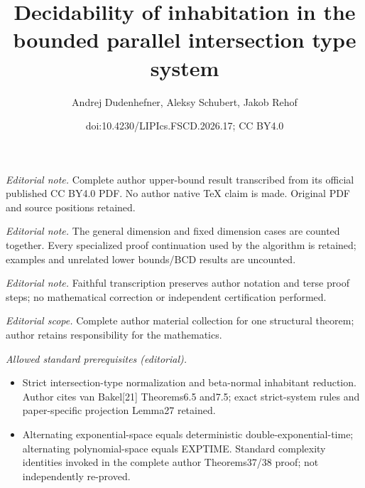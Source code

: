 \documentclass[10pt,a4paper]{article}
\title{Decidability of inhabitation in the bounded parallel intersection type system}
\author{Andrej Dudenhefner, Aleksy Schubert, Jakob Rehof}
\date{doi:10.4230/LIPIcs.FSCD.2026.17; CC BY4.0}
\begin{document}
\maketitle
\noindent\textit{Editorial note.} Complete author upper-bound result transcribed from its official published CC BY4.0 PDF. No author native TeX claim is made. Original PDF and source positions retained.\par\medskip
\noindent\textit{Editorial note.} The general dimension and fixed dimension cases are counted together. Every specialized proof continuation used by the algorithm is retained; examples and unrelated lower bounds/BCD results are uncounted.\par\medskip
\noindent\textit{Editorial note.} Faithful transcription preserves author notation and terse proof steps; no mathematical correction or independent certification performed.\par\medskip
\noindent\textit{Editorial scope.} Complete author material collection for one structural theorem; author retains responsibility for the mathematics.\par\medskip
\noindent\textit{Allowed standard prerequisites (editorial).}\begin{itemize}
\item Strict intersection-type normalization and beta-normal inhabitant reduction. Author cites van Bakel[21] Theorems6.5 and7.5; exact strict-system rules and paper-specific projection Lemma27 retained.
\item Alternating exponential-space equals deterministic double-exponential-time; alternating polynomial-space equals EXPTIME. Standard complexity identities invoked in the complete author Theorems37/38 proof; not independently re-proved.
\end{itemize}\medskip
\end{document}
